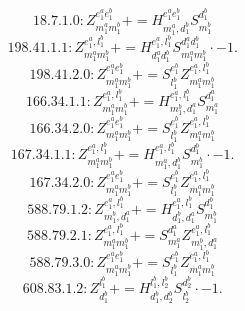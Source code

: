 \documentclass[letterpaper,10pt,fleqn,leqno,onecolumn]{article}
\begin{document}
\begin{equation} \;\;\;\;\;\;  18.7.1.0: Z^{e_{1}^{a}e_{1}^{b}}_{m_{1}^{a}m_{1}^{b}}+=H^{e_{1}^{a}e_{1}^{b}}_{m_{1}^{a},d_{1}^{b}}S^{d_{1}^{b}}_{m_{1}^{b}} \end{equation}
\begin{equation} \;\;\;\;\;\;  198.41.1.1: Z^{e_{1}^{a},l_{1}^{b}}_{m_{1}^{a}m_{1}^{b}}+=H^{e_{1}^{a},l_{1}^{b}}_{d_{1}^{a}d_{1}^{b}}S^{d_{1}^{a}d_{1}^{b}}_{m_{1}^{a}m_{1}^{b}}\cdot -1. \end{equation}
\begin{equation} \;\;\;\;\;\;  198.41.2.0: Z^{e_{1}^{a}e_{1}^{b}}_{m_{1}^{a}m_{1}^{b}}+=S^{e_{1}^{b}}_{l_{1}^{b}}Z^{e_{1}^{a},l_{1}^{b}}_{m_{1}^{a}m_{1}^{b}} \end{equation}
\begin{equation} \;\;\;\;\;\;  166.34.1.1: Z^{e_{1}^{a},l_{1}^{b}}_{m_{1}^{a}m_{1}^{b}}+=H^{e_{1}^{a},l_{1}^{b}}_{m_{1}^{b},d_{1}^{a}}S^{d_{1}^{a}}_{m_{1}^{a}} \end{equation}
\begin{equation} \;\;\;\;\;\;  166.34.2.0: Z^{e_{1}^{a}e_{1}^{b}}_{m_{1}^{a}m_{1}^{b}}+=S^{e_{1}^{b}}_{l_{1}^{b}}Z^{e_{1}^{a},l_{1}^{b}}_{m_{1}^{a}m_{1}^{b}} \end{equation}
\begin{equation} \;\;\;\;\;\;  167.34.1.1: Z^{e_{1}^{a},l_{1}^{b}}_{m_{1}^{a}m_{1}^{b}}+=H^{e_{1}^{a},l_{1}^{b}}_{m_{1}^{a},d_{1}^{b}}S^{d_{1}^{b}}_{m_{1}^{b}}\cdot -1. \end{equation}
\begin{equation} \;\;\;\;\;\;  167.34.2.0: Z^{e_{1}^{a}e_{1}^{b}}_{m_{1}^{a}m_{1}^{b}}+=S^{e_{1}^{b}}_{l_{1}^{b}}Z^{e_{1}^{a},l_{1}^{b}}_{m_{1}^{a}m_{1}^{b}} \end{equation}
\begin{equation} \;\;\;\;\;\;  588.79.1.2: Z^{e_{1}^{a},l_{1}^{b}}_{m_{1}^{b},d_{1}^{a}}+=H^{e_{1}^{a},l_{1}^{b}}_{d_{1}^{b},d_{1}^{a}}S^{d_{1}^{b}}_{m_{1}^{b}} \end{equation}
\begin{equation} \;\;\;\;\;\;  588.79.2.1: Z^{e_{1}^{a},l_{1}^{b}}_{m_{1}^{a}m_{1}^{b}}+=S^{d_{1}^{a}}_{m_{1}^{a}}Z^{e_{1}^{a},l_{1}^{b}}_{m_{1}^{b},d_{1}^{a}} \end{equation}
\begin{equation} \;\;\;\;\;\;  588.79.3.0: Z^{e_{1}^{a}e_{1}^{b}}_{m_{1}^{a}m_{1}^{b}}+=S^{e_{1}^{b}}_{l_{1}^{b}}Z^{e_{1}^{a},l_{1}^{b}}_{m_{1}^{a}m_{1}^{b}} \end{equation}
\begin{equation} \;\;\;\;\;\;  608.83.1.2: Z^{l_{1}^{b}}_{d_{1}^{b}}+=H^{l_{1}^{b},l_{2}^{b}}_{d_{1}^{b},d_{2}^{b}}S^{d_{2}^{b}}_{l_{2}^{b}}\cdot -1. \end{equation}
\end{document}
